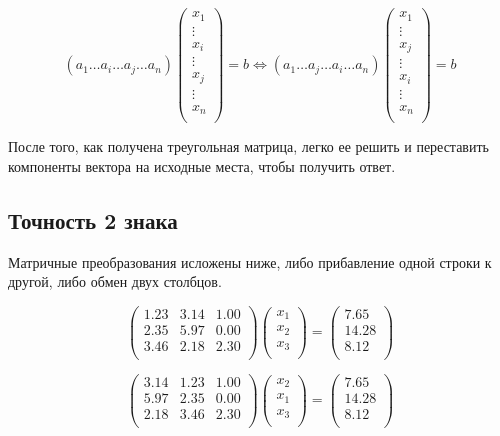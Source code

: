 \documentclass[11pt,a4paper,oneside]{article}
\begin{document}
$$ (a_1 \dots a_i \dots a_j \dots a_n)
\left(\begin{matrix}
	x_1 \\
	\vdots \\
	x_i \\
	\vdots \\
	x_j \\
	\vdots \\
	x_n \\
\end{matrix}\right) = b \iff
(a_1 \dots a_j \dots a_i \dots a_n)
\left(\begin{matrix}
	x_1 \\
	\vdots \\
	x_j \\
	\vdots \\
	x_i \\
	\vdots \\
	x_n \\
\end{matrix}\right) = b $$

После того, как получена треугольная матрица, легко ее решить и переставить компоненты вектора на исходные места, чтобы получить ответ.

\subsection{Точность 2 знака}

Матричные преобразования исложены ниже, либо прибавление одной строки к другой, либо обмен двух столбцов.

$$ \left(\begin{matrix}
1.23 & 3.14 & 1.00 \\
2.35 & 5.97 & 0.00 \\
3.46 & 2.18 & 2.30 \\
\end{matrix}\right)
\left(\begin{matrix}
x_1 \\
x_2 \\
x_3 \\
\end{matrix}\right)
=
\left(\begin{matrix}
7.65 \\
14.28 \\
8.12 \\
\end{matrix}\right) $$

$$ \left(\begin{matrix}
3.14 & 1.23 & 1.00 \\
5.97 & 2.35 & 0.00 \\
2.18 & 3.46 & 2.30 \\
\end{matrix}\right)
\left(\begin{matrix}
x_2 \\
x_1 \\
x_3 \\
\end{matrix}\right)
=
\left(\begin{matrix}
7.65 \\
14.28 \\
8.12 \\
\end{matrix}\right) $$
\end{document}

